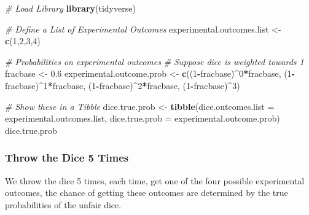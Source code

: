 \documentclass[
]{book}
\newenvironment{Shaded}{\begin{snugshade}}{\end{snugshade}}
\newcommand{\CommentTok}[1]{\textcolor[rgb]{0.56,0.35,0.01}{\textit{#1}}}
\newcommand{\DataTypeTok}[1]{\textcolor[rgb]{0.13,0.29,0.53}{#1}}
\newcommand{\DecValTok}[1]{\textcolor[rgb]{0.00,0.00,0.81}{#1}}
\newcommand{\FloatTok}[1]{\textcolor[rgb]{0.00,0.00,0.81}{#1}}
\newcommand{\KeywordTok}[1]{\textcolor[rgb]{0.13,0.29,0.53}{\textbf{#1}}}
\newcommand{\NormalTok}[1]{#1}
\newcommand{\OperatorTok}[1]{\textcolor[rgb]{0.81,0.36,0.00}{\textbf{#1}}}
\newcommand{\StringTok}[1]{\textcolor[rgb]{0.31,0.60,0.02}{#1}}
\begin{document}
\begin{Shaded}
\begin{Highlighting}[]
\CommentTok{\# Load Library}
\KeywordTok{library}\NormalTok{(tidyverse)}

\CommentTok{\# Define a List of Experimental Outcomes}
\NormalTok{experimental.outcomes.list \textless{}{-}}\StringTok{ }\KeywordTok{c}\NormalTok{(}\DecValTok{1}\NormalTok{,}\DecValTok{2}\NormalTok{,}\DecValTok{3}\NormalTok{,}\DecValTok{4}\NormalTok{)}

\CommentTok{\# Probabilities on experimental outcomes}
\CommentTok{\# Suppose dice is weighted towards 1}
\NormalTok{fracbase \textless{}{-}}\StringTok{ }\FloatTok{0.6}
\NormalTok{experimental.outcome.prob \textless{}{-}}\StringTok{ }\KeywordTok{c}\NormalTok{((}\DecValTok{1}\OperatorTok{{-}}\NormalTok{fracbase)}\OperatorTok{\^{}}\DecValTok{0}\OperatorTok{*}\NormalTok{fracbase,}
\NormalTok{                               (}\DecValTok{1}\OperatorTok{{-}}\NormalTok{fracbase)}\OperatorTok{\^{}}\DecValTok{1}\OperatorTok{*}\NormalTok{fracbase,}
\NormalTok{                               (}\DecValTok{1}\OperatorTok{{-}}\NormalTok{fracbase)}\OperatorTok{\^{}}\DecValTok{2}\OperatorTok{*}\NormalTok{fracbase,}
\NormalTok{                               (}\DecValTok{1}\OperatorTok{{-}}\NormalTok{fracbase)}\OperatorTok{\^{}}\DecValTok{3}\NormalTok{)}

\CommentTok{\# Show these in a Tibble}
\NormalTok{dice.true.prob \textless{}{-}}\StringTok{ }\KeywordTok{tibble}\NormalTok{(}\DataTypeTok{dice.outcomes.list =}\NormalTok{ experimental.outcomes.list,}
                         \DataTypeTok{dice.true.prob =}\NormalTok{ experimental.outcome.prob)}
\NormalTok{dice.true.prob}
\end{Highlighting}
\end{Shaded}

\hypertarget{throw-the-dice-5-times}{%
\subsubsection{Throw the Dice 5 Times}\label{throw-the-dice-5-times}}

We throw the dice 5 times, each time, get one of the four possible experimental outcomes, the chance of getting these outcomes are determined by the true probabilities of the unfair dice.
\end{document}
